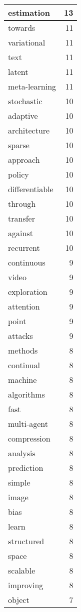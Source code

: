 \begin{table}[h]
\begin{tabular}{|l|r|}
\hline
estimation & 13 \\
\hline
towards & 11 \\
\hline
variational & 11 \\
\hline
text & 11 \\
\hline
latent & 11 \\
\hline
meta-learning & 11 \\
\hline
stochastic & 10 \\
\hline
adaptive & 10 \\
\hline
architecture & 10 \\
\hline
sparse & 10 \\
\hline
approach & 10 \\
\hline
policy & 10 \\
\hline
differentiable & 10 \\
\hline
through & 10 \\
\hline
transfer & 10 \\
\hline
against & 10 \\
\hline
recurrent & 10 \\
\hline
continuous & 9 \\
\hline
video & 9 \\
\hline
exploration & 9 \\
\hline
attention & 9 \\
\hline
point & 9 \\
\hline
attacks & 9 \\
\hline
methods & 8 \\
\hline
continual & 8 \\
\hline
machine & 8 \\
\hline
algorithms & 8 \\
\hline
fast & 8 \\
\hline
multi-agent & 8 \\
\hline
compression & 8 \\
\hline
analysis & 8 \\
\hline
prediction & 8 \\
\hline
simple & 8 \\
\hline
image & 8 \\
\hline
bias & 8 \\
\hline
learn & 8 \\
\hline
structured & 8 \\
\hline
space & 8 \\
\hline
scalable & 8 \\
\hline
improving & 8 \\
\hline
object & 7 \\

\end{tabular}
\end{table}
